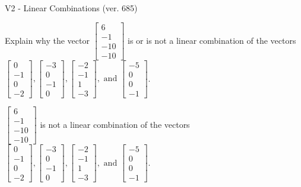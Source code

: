 \begin{exercise}
  \begin{exerciseTitle}V2 - Linear Combinations (ver. 685)\end{exerciseTitle}
  \begin{exerciseStatement}
    Explain why the vector \(\left[\begin{array}{c}
6 \\
-1 \\
-10 \\
-10
\end{array}\right]\)  is or is not a linear 
	combination of the vectors \(\left[\begin{array}{c}
0 \\
-1 \\
0 \\
-2
\end{array}\right] , \left[\begin{array}{c}
-3 \\
0 \\
-1 \\
0
\end{array}\right] , \left[\begin{array}{c}
-2 \\
-1 \\
1 \\
-3
\end{array}\right] , \text{ and } \left[\begin{array}{c}
-5 \\
0 \\
0 \\
-1
\end{array}\right]\).
	


  \end{exerciseStatement}
  \begin{exerciseAnswer}
   \(\left[\begin{array}{c}
6 \\
-1 \\
-10 \\
-10
\end{array}\right]\) 
  	 is not  
	a linear combination of the vectors \(\left[\begin{array}{c}
0 \\
-1 \\
0 \\
-2
\end{array}\right] , \left[\begin{array}{c}
-3 \\
0 \\
-1 \\
0
\end{array}\right] , \left[\begin{array}{c}
-2 \\
-1 \\
1 \\
-3
\end{array}\right] , \text{ and } \left[\begin{array}{c}
-5 \\
0 \\
0 \\
-1
\end{array}\right]\).


\end{exerciseAnswer}
\end{exercise}
